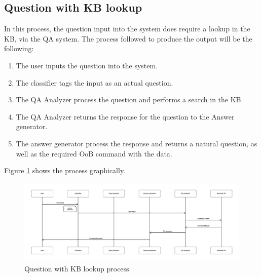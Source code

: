 \subsection{Question with \ac{KB} lookup}

In this process, the question input into the system does require a lookup in the \ac{KB}, via the \ac{QA} system. The process followed to produce the output will be the following:

\begin{enumerate}
 \item The user inputs the question into the system.
 \item The classifier tags the input as an actual question.
 \item The QA Analyzer process the question and performs a search in the \ac{KB}.
 \item The QA Analyzer returns the response for the question to the Answer generator.
 \item The answer generator process the response and returns a natural question, as well as the required \ac{OoB} command with the data.
\end{enumerate}

Figure \ref{fig:arch3} shows the process graphically.

\begin{figure}[!htbp]
    \centering
    \includegraphics[width=\textwidth]{img/arch/FullQuestion.png}
    \caption{Question with \ac{KB} lookup process}
    \label{fig:arch3}
\end{figure}

% 
